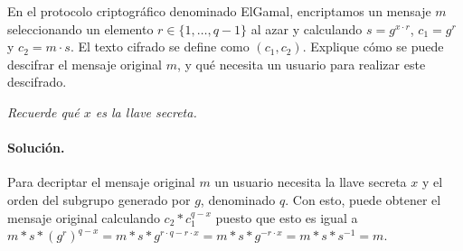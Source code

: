 En el protocolo criptográfico denominado ElGamal, encriptamos un mensaje $m$ seleccionando un elemento $r\in\{1,\ldots,q-1\}$ al azar y calculando $s=g^{x\cdot r}$, $c_1=g^r$ y $c_2=m\cdot s$. El texto cifrado se define como $(c_1, c_2)$. Explique cómo se puede descifrar el mensaje original $m$, y qué necesita un usuario para realizar este descifrado.

\emph{Recuerde qué $x$ es la llave secreta.}

\paragraph{Solución.} Para decriptar el mensaje original $m$ un usuario necesita la llave secreta $x$ y el orden del subgrupo generado por $g$, denominado $q$. Con esto, puede obtener el mensaje original calculando $c_2*c_1^{q-x}$ puesto que esto es igual a $m*s*(g^r)^{q-x}=m*s*g^{r\cdot q-r\cdot x}=m*s*g^{-r\cdot x}=m*s*s^{-1}=m$.
